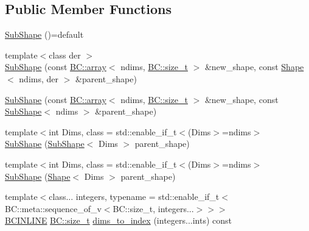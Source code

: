 \subsection*{Public Member Functions}
\begin{DoxyCompactItemize}
\item 
\hyperlink{classBC_1_1tensors_1_1exprs_1_1SubShape_ac4256af3a6cd413e82a83ef2398bd1bf}{Sub\+Shape} ()=default
\item 
{\footnotesize template$<$class der $>$ }\\\hyperlink{classBC_1_1tensors_1_1exprs_1_1SubShape_a82531b1c499ad61c64f925381296d58b}{Sub\+Shape} (const \hyperlink{structBC_1_1array}{B\+C\+::array}$<$ ndims, \hyperlink{namespaceBC_a6007cbc4eeec401a037b558910a56173}{B\+C\+::size\+\_\+t} $>$ \&new\+\_\+shape, const \hyperlink{classBC_1_1tensors_1_1exprs_1_1Shape}{Shape}$<$ ndims, der $>$ \&parent\+\_\+shape)
\item 
\hyperlink{classBC_1_1tensors_1_1exprs_1_1SubShape_affa10ca6f7cb0d3809b0d836014419f1}{Sub\+Shape} (const \hyperlink{structBC_1_1array}{B\+C\+::array}$<$ ndims, \hyperlink{namespaceBC_a6007cbc4eeec401a037b558910a56173}{B\+C\+::size\+\_\+t} $>$ \&new\+\_\+shape, const \hyperlink{classBC_1_1tensors_1_1exprs_1_1SubShape}{Sub\+Shape}$<$ ndims $>$ \&parent\+\_\+shape)
\item 
{\footnotesize template$<$int Dims, class  = std\+::enable\+\_\+if\+\_\+t$<$(\+Dims$>$=ndims$>$ }\\\hyperlink{classBC_1_1tensors_1_1exprs_1_1SubShape_add45ce5c506191481ac39e608070a99e}{Sub\+Shape} (\hyperlink{classBC_1_1tensors_1_1exprs_1_1SubShape}{Sub\+Shape}$<$ Dims $>$ parent\+\_\+shape)
\item 
{\footnotesize template$<$int Dims, class  = std\+::enable\+\_\+if\+\_\+t$<$(\+Dims$>$=ndims$>$ }\\\hyperlink{classBC_1_1tensors_1_1exprs_1_1SubShape_aac6b073a1e419f363c506b88e1a60fc2}{Sub\+Shape} (\hyperlink{classBC_1_1tensors_1_1exprs_1_1Shape}{Shape}$<$ Dims $>$ parent\+\_\+shape)
\item 
{\footnotesize template$<$class... integers, typename  = std\+::enable\+\_\+if\+\_\+t$<$\+B\+C\+::meta\+::sequence\+\_\+of\+\_\+v$<$\+B\+C\+::size\+\_\+t, integers...$>$$>$$>$ }\\\hyperlink{BlackCat__Common_8h_a6699e8b0449da5c0fafb878e59c1d4b1}{B\+C\+I\+N\+L\+I\+NE} \hyperlink{namespaceBC_a6007cbc4eeec401a037b558910a56173}{B\+C\+::size\+\_\+t} \hyperlink{classBC_1_1tensors_1_1exprs_1_1SubShape_af72cbd001ead576166ed85b2d1670966}{dims\+\_\+to\+\_\+index} (integers...\+ints) const 

\end{DoxyCompactItemize}

